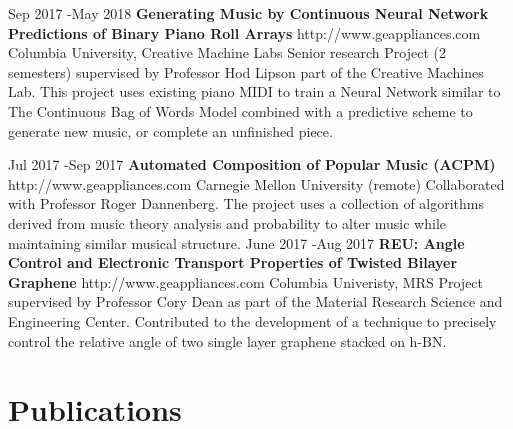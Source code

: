 \documentclass[10pt]{article} %
\begin{document}
\job
{Sep 2017 -}{May 2018}
{\bf{Generating Music by Continuous Neural Network Predictions of Binary Piano Roll Arrays}}
{http://www.geappliances.com}
{Columbia University, Creative Machine Labs}
{Senior research Project (2 semesters) supervised by Professor Hod Lipson part of the Creative Machines Lab. This project uses existing piano MIDI to train a Neural Network similar to The Continuous Bag of Words Model combined with a predictive scheme to generate new music, or complete an unfinished piece.}


\job
{Jul 2017 -}{Sep 2017}
{\bf{Automated Composition of Popular Music (ACPM) 
}}
{http://www.geappliances.com}
{Carnegie Mellon University (remote)}
{Collaborated with Professor Roger Dannenberg.  The project uses a collection of algorithms derived from music theory analysis and probability to alter music while maintaining similar musical structure.}
\job
{June 2017 -}{Aug 2017}
{\bf{REU: Angle Control and Electronic Transport Properties of Twisted Bilayer Graphene}}
{http://www.geappliances.com}
{Columbia Univeristy, MRS}
{Project supervised by Professor Cory Dean as part of the Material Research Science and Engineering Center. Contributed to the development of a technique to precisely control the relative angle of two single layer graphene stacked on h-BN.}

%
%
%
%
%


\section{Publications}
\end{document}
